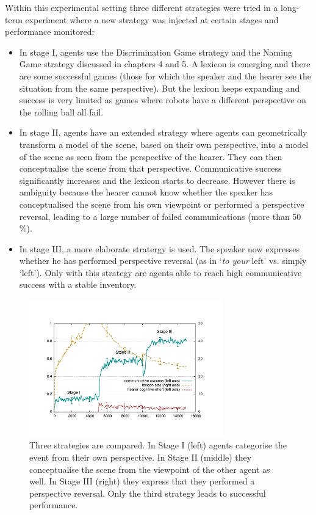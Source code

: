Within this experimental setting three different strategies were tried in a long-term experiment where
a new strategy was injected at certain stages and performance monitored: 
\begin{itemize}
\item In stage I, agents use 
the Discrimination Game strategy and the Naming Game strategy discussed in chapters 4 and 5. A 
lexicon is emerging and there are some successful games (those for which the speaker and the hearer see the situation from 
the same perspective). But the lexicon keeps expanding and success is very limited as games where robots have a different 
perspective on the rolling ball all fail. 
\item In stage II, agents have an extended 
strategy where agents can geometrically transform a model of the scene, based on their own perspective, into a model of the scene 
as seen from the perspective of the hearer. They can then conceptualise the scene from that perspective. 
Communicative success significantly increases and the 
lexicon starts to decrease. However there is ambiguity because the hearer cannot know whether
the speaker has conceptualised the 
scene from his own viewpoint or performed a perspective reversal, leading to a large number of failed communications 
(more than 50 \%). 
\item In stage III, a more elaborate stratergy is used. The speaker now expresses whether he has performed perspective 
reversal (as in `{\itshape to your} left' vs. simply `left'). Only with this strategy are agents able to reach high 
communicative success with a stable inventory. 
\end{itemize}


\begin{figure}[t]
\centerline{
\includegraphics[width=0.75\textwidth]{chap10/figs/stages.pdf}}
\caption{\label{fig:stages}Three strategies are compared. In Stage I (left) agents categorise the event from their 
own perspective. In Stage II (middle) they conceptualise the scene from the viewpoint of the other agent as well. In Stage III (right) 
they express that they performed a perspective reversal. Only the third strategy leads to successful performance.} 
\end{figure}


